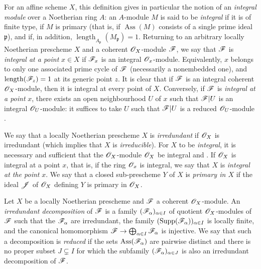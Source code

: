 For an affine scheme $X$, this definition gives in particular the notion of an \emph{integral module} over a Noetherian ring $A$: an $A$-module $M$ is said to be \emph{integral} if it is of finite type, if $M$ is primary (that is, if $\operatorname{Ass}(M)$ consists of a single prime ideal $\mathfrak{p}$), and if, in addition, $\operatorname{length}_{A_\mathfrak{p}}(M_\mathfrak{p})=1$.
Returning to an arbitrary locally Noetherian prescheme $X$ and a coherent $\mathscr{O}_X$-module $\mathscr{F}$, we say that $\mathscr{F}$ is \emph{integral at a point} $x\in X$ if $\mathscr{F}_x$ is an integral $\mathscr{O}_x$-module.  Equivalently, $x$ belongs to only one associated prime cycle of $\mathscr{F}$ (necessarily a nonembedded one), and $\operatorname{length}(\mathscr{F}_z)=1$ at its generic point $z$.
It is clear that if $\mathscr{F}$ is an integral coherent $\mathscr{O}_X$-module, then it is integral at every point of $X$.  Conversely, if $\mathscr{F}$ is \emph{integral at a point} $x$, there exists an open neighbourhood $U$ of $x$ such that $\mathscr{F}|U$ is an integral $\mathscr{O}_U$-module: it suffices to take $U$ such that $\mathscr{F}|U$ is a reduced $\mathscr{O}_U$-module .


We say that a locally Noetherian prescheme $X$ is \emph{irredundant} if $\mathscr{O}_X$ is irredundant (which implies that $X$ is \emph{irreducible}).  For $X$ to be \emph{integral}, it is necessary and sufficient that the $\mathscr{O}_X$-module $\mathscr{O}_X$ be integral  and .
If $\mathscr{O}_X$ is integral at a point $x$, that is, if the ring $\mathscr{O}_x$ is integral, we say that $X$ is \emph{integral at the point} $x$.
We say that a closed sub-prescheme $Y$ of $X$ is \emph{primary in $X$} if the ideal $\mathscr{J}$ of $\mathscr{O}_X$ defining $Y$ is primary in $\mathscr{O}_X$.

\begin{definition}[3.2.5]
\label{IV.3.2.5}
Let $X$ be a locally Noetherian prescheme and $\mathscr{F}$ a coherent $\mathscr{O}_X$-module.
An \emph{irredundant decomposition} of $\mathscr{F}$ is a family $(\mathscr{F}_\alpha)_{\alpha\in I}$ of quotient $\mathscr{O}_X$-modules of $\mathscr{F}$ such that the $\mathscr{F}_\alpha$ are irredundant, the family $(\operatorname{Supp}(\mathscr{F}_\alpha))_{\alpha\in I}$ is locally finite, and the canonical homomorphism $\mathscr{F}\to\bigoplus_{\alpha\in I}\mathscr{F}_\alpha$ is injective.
We say that such a decomposition is \emph{reduced} if the sets $\operatorname{Ass}(\mathscr{F}_\alpha)$ are pairwise distinct and there is no proper subset $J\subsetneq I$ for which the subfamily $(\mathscr{F}_\alpha)_{\alpha\in J}$ is also an irredundant decomposition of $\mathscr{F}$.
\end{definition}

